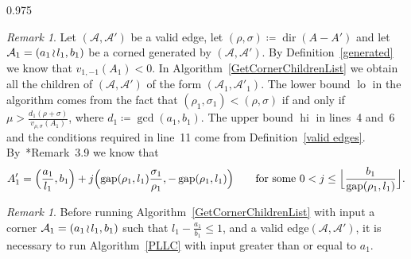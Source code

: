 \documentclass[reqno,a4paper,twoside]{amsart}
\theoremstyle{definition}
\theoremstyle{remark}
\newtheorem{remark}[theorem]{Remark}
\DeclareMathOperator{\gap}{gap}
\DeclareMathOperator{\dir}{dir}
\DeclareMathOperator{\lo}{lo}
\DeclareMathOperator{\hi}{hi}
\newcommand{\wrs}{\hspace{-0.9pt}\wr\hspace{-0.9pt}}
\begin{document}
\begin{spacing}{0.975}
\smallskip

\begin{remark} Let $(\mathcal{A},\mathcal{A}')$ be a valid edge, let $(\rho,\sigma)\coloneqq \dir(A-A')$ and let $\mathcal{A}_1 = (a_1\wrs l_1,b_1)$ be a corned generated by $(\mathcal{A},\mathcal{A}')$. By Definition~\ref{generated} we know that $v_{1,-1}(A_1)<0$. In Algorithm~\ref{GetCornerChildrenList} we obtain all the children of $(\mathcal{A},\mathcal{A}')$ of the form $(\mathcal{A}_1,\mathcal{A}'_1)$. The lower bound $\lo$ in the algorithm comes from the fact that $(\rho_1,\sigma_1)<(\rho,\sigma)$ if and only if $\mu> \frac{d_1(\rho+\sigma)}{v_{\rho,\sigma}(A_1)}$, where $d_1\coloneqq \gcd(a_1,b_1)$. The upper bound $\hi$ in lines~4 and~6 and the conditions required in line~11 come from Definition~\ref{valid edges}. By~\cite{GGV2}*{Re\-mark~3.9} we know that
$$
A_1'=\Bigl(\frac{a_1}{l_1},b_1\Bigr)+j\Bigl(\gap(\rho_1,l_1) \frac{\sigma_1}{\rho_1},-\gap(\rho_1,l_1)\Bigr)\qquad\text{for some $0<j\le \Big\lfloor \frac{b_1}{\gap(\rho_1,l_1)}\Big\rfloor$.}
$$
\end{remark}

\begin{remark}
Before running Algorithm~\ref{GetCornerChildrenList} with input a corner $\mathcal{A}_1=(a_1\wrs l_1,b_1)$ such that $l_1-\frac{a_1}{b_1}\le 1$, and a valid edge$(\mathcal{A},\mathcal{A}')$, it is necessary to run Algorithm~\ref{PLLC} with input greater than or equal to $a_1$.
\end{remark}


\end{spacing}
\end{document}
